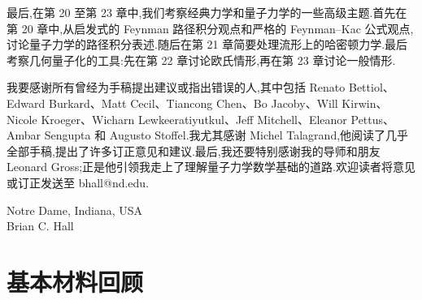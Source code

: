 \documentclass[traditional=false,draftmark=false,colors=true,fontsetup=feec-fonts.tex,titlesetup=titles-setup.tex]{AJbook}
\begin{document}
最后,在第 20 至第 23 章中,我们考察经典力学和量子力学的一些高级主题.首先在第 20 章中,从启发式的 Feynman 路径积分观点和严格的 Feynman--Kac 公式观点,讨论量子力学的路径积分表述.随后在第 21 章简要处理流形上的哈密顿力学.最后考察几何量子化的工具:先在第 22 章讨论欧氏情形,再在第 23 章讨论一般情形.

我要感谢所有曾经为手稿提出建议或指出错误的人,其中包括 Renato Bettiol、Edward Burkard、Matt Cecil、Tiancong Chen、Bo Jacoby、Will Kirwin、Nicole Kroeger、Wicharn Lewkeeratiyutkul、Jeff Mitchell、Eleanor Pettus、Ambar Sengupta 和 Augusto Stoffel.我尤其感谢 Michel Talagrand,他阅读了几乎全部手稿,提出了许多订正意见和建议.最后,我还要特别感谢我的导师和朋友 Leonard Gross;正是他引领我走上了理解量子力学数学基础的道路.欢迎读者将意见或订正发送至 bhall@nd.edu.

\begin{flushright}
Notre Dame, Indiana, USA\\
Brian C. Hall
\end{flushright}

\tableofcontents

\mainmatter

























\appendix
\chapter{基本材料回顾}
\label{chap:appendix}


\backmatter
\printindex
\nocite{*}
\printbibliography[heading=bibintoc,title=参考文献]
\end{document}

